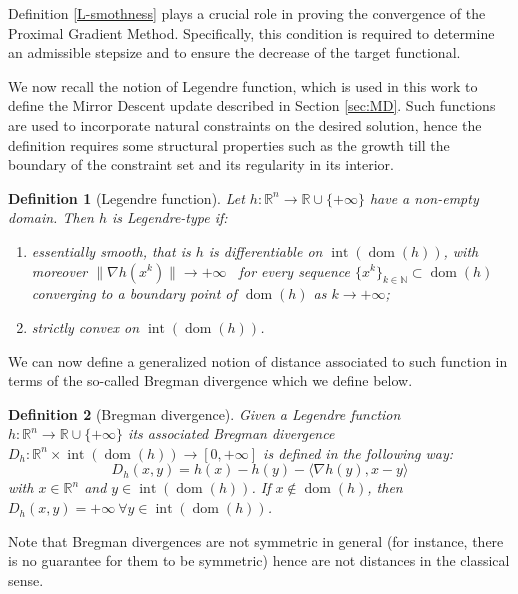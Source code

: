 \documentclass[letterpaper]{article}
\newtheorem{definition}{Definition}
\begin{document}
Definition \ref{L-smothness} plays a crucial role in proving the convergence of the Proximal Gradient Method. Specifically, this condition is required to determine an admissible stepsize and to ensure the decrease of the target functional.

\smallskip

We now recall the notion of Legendre function, which is  used in this work to define the Mirror Descent update described in Section \ref{sec:MD}. Such functions are used to incorporate natural constraints on the desired solution, hence the definition requires some structural properties such as the growth till the boundary of the constraint set and its regularity in its interior. 
\begin{definition}[Legendre function]\label{def:Legendre function}
    Let \( h: \mathbb{R}^n \to \mathbb{R} \cup \{+ \infty\} \) have a non-empty domain. Then $h$ is Legendre-type if:
\begin{enumerate}
    \item[(i)] essentially smooth, that is \( h \) is differentiable on $ \operatorname{int}(\operatorname{dom}(h))$, with moreover $\| \nabla h(x^k) \| \to + \infty$ \ for every sequence \( \{x^k\}_{k \in \mathbb{N}} \subset \operatorname{dom}(h) \) converging to a boundary point of \( \operatorname{dom}(h)\) as \( k \to +\infty \);
    \item[(ii)]  strictly convex on \( \operatorname{int}(\operatorname{dom}(h))\).
\end{enumerate}
\end{definition}

We can now define a generalized notion of distance associated to such function in terms of the so-called Bregman divergence which we define below.
\begin{definition}[Bregman divergence] \label{Bregman divergence}
    Given a Legendre function $h: \mathbb{R}^n \to \mathbb{R} \cup \{+ \infty\}$ its associated Bregman divergence $D_h:\mathbb{R}^n \times \operatorname{int}(\operatorname{dom}(h)) \longrightarrow [0,+\infty]$ is defined in the following way:
\begin{equation}
    D_h(x,y)=h(x) - h(y) - \langle \nabla h (y), x-y  \rangle  \label{bregman distance}
\end{equation}
with $x \in \mathbb{R}^n$ and $y \in \operatorname{int}(\operatorname{dom}(h))$. If $x \notin \operatorname{dom}(h)$, then $D_h(x,y)=+\infty \ \forall y \in \operatorname{int}(\operatorname{dom}(h))$. 
\end{definition}
Note that Bregman divergences are not symmetric in general (for instance, there is no guarantee for them to be symmetric) hence are not distances in the classical sense.
\end{document}
